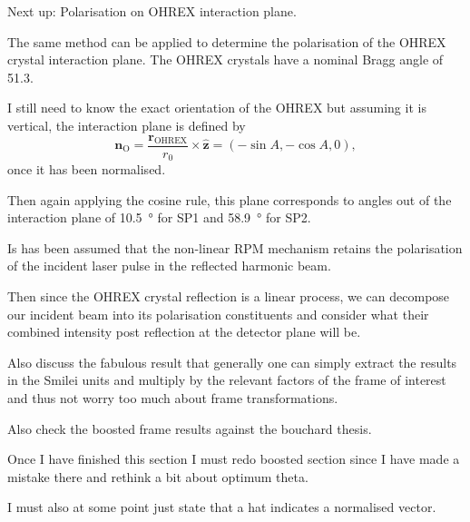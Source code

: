 Next up: Polarisation on OHREX interaction plane.

The same method can be applied to determine the polarisation of the OHREX crystal interaction plane. The OHREX crystals have a nominal Bragg angle of 51.3\degree.

I still need to know the exact orientation of the OHREX but assuming it is vertical, the interaction plane is defined by
\begin{equation}
	\mathbf{n}_\mathrm{O} =  \frac{\mathbf{r}_\mathrm{OHREX}}{r_0} \times \hat{\mathbf{z}}= (-\sin A, -\cos A, 0),
\end{equation}
once it has been normalised.

Then again applying the cosine rule, this plane corresponds to angles out of the interaction plane of \qty{10.5}{\degree} for SP1 and \qty{58.9}{\degree} for SP2.

Is has been assumed that the non-linear RPM mechanism retains the polarisation of the incident laser pulse in the reflected harmonic beam.

Then since the OHREX crystal reflection is a linear process, we can decompose our incident beam into its polarisation constituents and consider what their combined intensity post reflection at the detector plane will be.

Also discuss the fabulous result that generally one can simply extract the results in the Smilei units and multiply by the relevant factors of the frame of interest and thus not worry too much about frame transformations.

Also check the boosted frame results against the bouchard thesis.


Once I have finished this section I must redo boosted section since I have made a mistake there and rethink a bit about optimum theta.

I must also at some point just state that a hat indicates a normalised vector.

